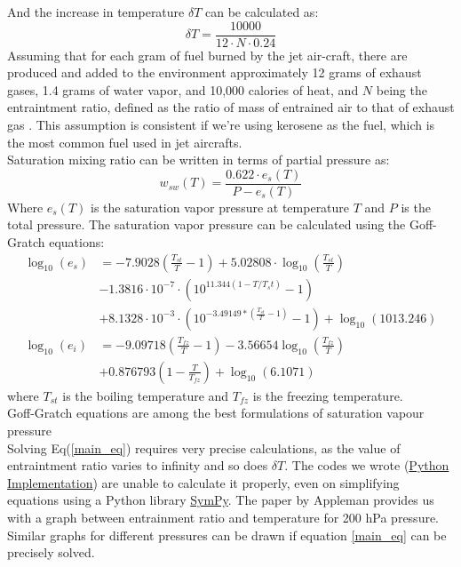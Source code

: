 \documentclass[a4paper, 12pt]{report}
\begin{document}
And the increase in temperature $\delta T$ can be calculated as:
\begin{equation}
        \delta T = \frac{10000}{12\cdot N \cdot 0.24}
\end{equation}
Assuming that for each gram of fuel burned by the jet air-craft, there are produced and added to the environment approximately 12 grams of exhaust gases, 1.4 grams of water vapor, and 10,000 calories of heat, and $N$ being the entraintment ratio, defined as the ratio of mass of entrained air to that of exhaust gas . This assumption is consistent if we're using kerosene as the fuel, which is the most common fuel used in jet aircrafts.\\

Saturation mixing ratio can be written in terms of partial pressure as:
\begin{equation*}
        w_{sw}(T) = \frac{0.622\cdot e_s(T)}{P - e_s(T)}
\end{equation*} 
Where $e_s(T)$ is the saturation vapor pressure at temperature $T$ and $P$ is the total pressure. The saturation vapor pressure can be calculated using the Goff-Gratch equations\cite{goff}:
\begin{align*}
        \log_{10}(e_s) &= -7.9028\left(\frac{T_{st}}{T}-1\right)+5.02808\cdot \log_{10}\left(\frac{T_{st}}{T}\right)\\
        &-1.3816\cdot 10^{-7}\cdot \left(10^{11.344\left(1-T/T_st\right)}-1\right)\\
        &+8.1328\cdot 10^{-3} \cdot \left(10^{-3.49149*\left(\frac{T_{st}}{T}-1\right)}-1\right) + \log_{10}(1013.246)\\
        \log_{10}(e_i) &=
        -9.09718\left(\frac{T_{fz}}{T}-1\right)-3.56654\log_{10}\left(\frac{T_{fz}}{T}\right)\\
        &+0.876793\left(1-\frac{T}{T_{fz}}\right) + \log_{10}(6.1071)
\end{align*}
where $T_{st}$ is the boiling temperature and $T_{fz}$ is the freezing temperature.\\

Goff-Gratch equations are among the best formulations of saturation vapour pressure \cite{goff_best}\\

Solving Eq(\ref{main_eq}) requires very precise calculations, as the value of entraintment ratio varies to infinity and so does $\delta T$. The codes we wrote (\href{https://github.com/rakshaksoftware/Lufthansa_RnD/blob/a576fb76df17789dc0cbd9c826ec15cb92f276cc/code/solved.py}{Python Implementation}) are unable to calculate it properly, even on simplifying equations using a Python library \href{https://www.sympy.org/en/index.html}{SymPy}. The paper by Appleman provides us with a graph between entrainment ratio and temperature for 200 hPa pressure. Similar graphs for different pressures can be drawn if equation \ref{main_eq} can be precisely solved.\\
\end{document}
